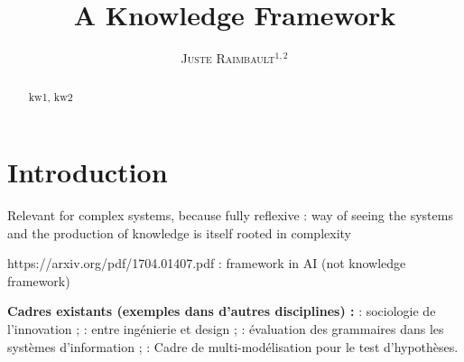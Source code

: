 \documentclass[runningheads,a4paper]{llncs2e/llncs}
\newcommand{\keywords}[1]{\par\addvspace\baselineskip
\noindent\keywordname\enspace\ignorespaces#1}
\newcommand{\noun}[1]{\textsc{#1}}
\begin{document}
\mainmatter  %




\title{A Knowledge Framework}


%
%
\author{\noun{Juste Raimbault}$^{1,2}$}
%


\maketitle


\begin{abstract}

\keywords{kw1, kw2}
\end{abstract}



\section{Introduction}

Relevant for complex systems, because fully reflexive : way of seeing the systems and the production of knowledge is itself rooted in complexity

https://arxiv.org/pdf/1704.01407.pdf : framework in AI (not knowledge framework)

\textbf{Cadres existants (exemples dans d'autres disciplines) : } \cite{carlile2004transferring} : sociologie de l'innovation ; \cite{durantin2017disruptive} : entre ingénierie et design ; \cite{gemino2004framework} : évaluation des grammaires dans les systèmes d'information ; \cite{cottineau2015modular} : Cadre de multi-modélisation pour le test d'hypothèses.
\end{document}
